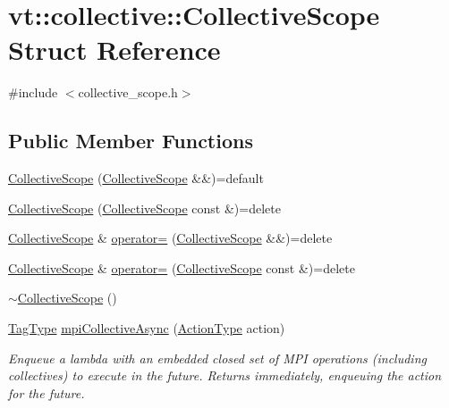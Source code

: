 \hypertarget{structvt_1_1collective_1_1_collective_scope}{}\section{vt\+:\+:collective\+:\+:Collective\+Scope Struct Reference}
\label{structvt_1_1collective_1_1_collective_scope}


{\ttfamily \#include $<$collective\+\_\+scope.\+h$>$}

\subsection*{Public Member Functions}
\begin{DoxyCompactItemize}
\item 
\hyperlink{structvt_1_1collective_1_1_collective_scope_ac0f36175489c3afa6d751813cb6f9286}{Collective\+Scope} (\hyperlink{structvt_1_1collective_1_1_collective_scope}{Collective\+Scope} \&\&)=default
\item 
\hyperlink{structvt_1_1collective_1_1_collective_scope_a9781b1b86796d271cc9407eb8034851f}{Collective\+Scope} (\hyperlink{structvt_1_1collective_1_1_collective_scope}{Collective\+Scope} const \&)=delete
\item 
\hyperlink{structvt_1_1collective_1_1_collective_scope}{Collective\+Scope} \& \hyperlink{structvt_1_1collective_1_1_collective_scope_a4a756e93437119e20a72dfe0d9ede190}{operator=} (\hyperlink{structvt_1_1collective_1_1_collective_scope}{Collective\+Scope} \&\&)=delete
\item 
\hyperlink{structvt_1_1collective_1_1_collective_scope}{Collective\+Scope} \& \hyperlink{structvt_1_1collective_1_1_collective_scope_ae211d02b75ae45834e25eb1cd8c2f7d0}{operator=} (\hyperlink{structvt_1_1collective_1_1_collective_scope}{Collective\+Scope} const \&)=delete
\item 
\hyperlink{structvt_1_1collective_1_1_collective_scope_a0b8d9664cdc7f94bed4b17e0eb5c2b77}{$\sim$\+Collective\+Scope} ()
\item 
\hyperlink{namespacevt_a84ab281dae04a52a4b243d6bf62d0e52}{Tag\+Type} \hyperlink{structvt_1_1collective_1_1_collective_scope_ad116d0b00f28b79dbf7c4b0e5c4ed4a1}{mpi\+Collective\+Async} (\hyperlink{namespacevt_ae0a5a7b18cc99d7b732cb4d44f46b0f3}{Action\+Type} action)
\begin{DoxyCompactList}\small\item\em Enqueue a lambda with an embedded closed set of M\+PI operations (including collectives) to execute in the future. Returns immediately, enqueuing the action for the future. \end{DoxyCompactList}\item 

\end{DoxyCompactItemize}
